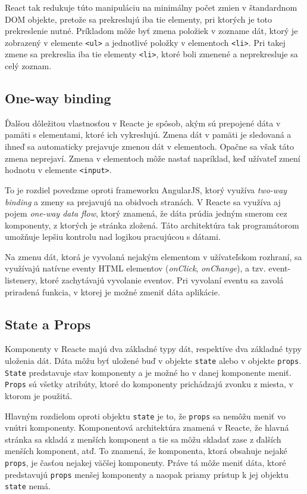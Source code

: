 \documentclass[
  digital, %
  table,   %
  lof,     %
  lot,     %
]{fithesis3}
\begin{document}
React tak redukuje túto manipuláciu na minimálny počet zmien v štandardnom DOM objekte, pretože sa prekreslujú iba tie elementy, pri ktorých je toto prekreslenie nutné. Príkladom môže byť zmena položiek v zozname dát, ktorý je zobrazený v elemente \texttt{<ul>} a jednotlivé položky v elementoch \texttt{<li>}. Pri takej zmene sa prekreslia iba tie elementy \texttt{<li>}, ktoré boli zmenené a neprekresluje sa celý zoznam.

\subsection{One-way binding} \label{sec:oneway-binding}
Ďalšou dôležitou vlastnosťou v Reacte je spôsob, akým sú prepojené dáta v pamäti s elementami, ktoré ich vykreslujú. Zmena dát v pamäti je sledovaná a ihneď sa automaticky prejavuje zmenou dát v elementoch. Opačne sa však táto zmena neprejaví. Zmena v elementoch môže nastať napríklad, keď užívateľ zmení hodnotu v elemente \texttt{<input>}.

To je rozdiel povedzme oproti frameworku AngularJS, ktorý využíva \textit{two-way binding} a zmeny sa prejavujú na obidvoch stranách. V Reacte sa využíva aj pojem \textit{one-way data flow}, ktorý znamená, že dáta prúdia jedným smerom cez komponenty, z ktorých je stránka zložená. Táto architektúra tak programátorom umožňuje lepšiu kontrolu nad logikou pracujúcou s dátami.

Na zmenu dát, ktorá je vyvolaná nejakým elementom v užívateľskom rozhraní, sa využívajú natívne eventy HTML elementov (\textit{onClick}, \textit{onChange}), a tzv. event-listenery, ktoré zachytávajú vyvolanie eventov. Pri vyvolaní eventu sa zavolá priradená funkcia, v ktorej je možné zmeniť dáta aplikácie.

\subsection{State a Props}
Komponenty v Reacte majú dva základné typy dát, respektíve dva základné typy uloženia dát. Dáta môžu byť uložené buď v objekte \texttt{state} alebo v objekte \texttt{props}. \texttt{State} predstavuje stav komponenty a je možné ho v danej komponente meniť. \texttt{Props} sú všetky atribúty, ktoré do komponenty prichádzajú zvonku z miesta, v ktorom je použitá.

Hlavným rozdielom oproti objektu \texttt{state} je to, že \texttt{props} sa nemôžu meniť vo vnútri komponenty. Komponentová architektúra znamená v Reacte, že hlavná stránka sa skladá z menších komponent a tie sa môžu skladať zase z ďalších menších komponent, atď. To znamená, že komponenta, ktorá obsahuje nejaké \texttt{props}, je časťou nejakej väčšej komponenty. Práve tá môže meniť dáta, ktoré predstavujú \texttt{props} menšej komponenty a naopak priamy prístup k jej objektu \texttt{state} nemá.
\end{document}
